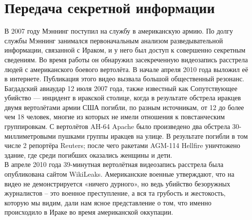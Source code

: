 ﻿\section{Передача секретной информации}
В 2007 году Мэннинг поступил на службу в американскую армию. По долгу службы Мэннинг занимался первоначальным анализом разведывательной информации, связанной с Ираком, и у него был доступ к совершенно секретным сведениям. Во время работы он обнаружил засекреченную видеозапись расстрела людей с американского боевого вертолёта. В начале апреля 2010 года выложил её в интернете. Публикация этого видео вызвала большой общественный резонанс. \cite{Manning} \\
Багдадский авиаудар 12 июля 2007 года, также известный как Сопутствующее убийство — инцидент в иракской столице, когда в результате обстрела иракцев двумя вертолётами армии США погибли, по разным источникам, от 12 до более чем 18 человек, многие из которых не имели отношения к повстанческим группировкам. С вертолётов AH-64 Apache было произведено два обстрела 30-миллиметровыми пушками группы иракцев на улице. В результате погибли в том числе 2 репортёра Reuters; после чего ракетами AGM-114 Hellfire уничтожено здание, где среди погибших оказались женщины и дети. \\
В апреле 2010 года 39-минутная вертолётная видеозапись расстрела была опубликована сайтом WikiLeaks. \cite{Udar} Американские военные утверждают, что на видео не демонстрируется «ничего дурного», но ведь убийство безоружных журналистов – это военное преступление, а вся та грубость и жестокость, которую мы видим, дали нам ясное представление о том, что именно происходило в Ираке во время американской оккупации. \cite{Argument}